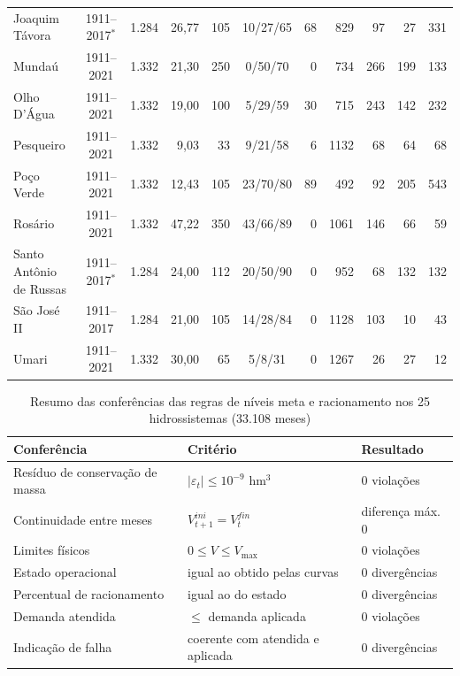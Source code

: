 \begin{table}[!htbp]
{\begin{tabular}{lcrrrcrrrrr}
        Joaquim Távora & 1911--2017$^{*}$ & 1.284 & 26,77 & 105 & 10/27/65 & 68 & 829 & 97 & 27 & 331 \\
        Mundaú & 1911--2021 & 1.332 & 21,30 & 250 & 0/50/70 & 0 & 734 & 266 & 199 & 133 \\
        Olho D'Água & 1911--2021 & 1.332 & 19,00 & 100 & 5/29/59 & 30 & 715 & 243 & 142 & 232 \\
        Pesqueiro & 1911--2021 & 1.332 & 9,03 & 33 & 9/21/58 & 6 & 1132 & 68 & 64 & 68 \\
        Poço Verde & 1911--2021 & 1.332 & 12,43 & 105 & 23/70/80 & 89 & 492 & 92 & 205 & 543 \\
        Rosário & 1911--2021 & 1.332 & 47,22 & 350 & 43/66/89 & 0 & 1061 & 146 & 66 & 59 \\
        Santo Antônio de Russas & 1911--2017$^{*}$ & 1.284 & 24,00 & 112 & 20/50/90 & 0 & 952 & 68 & 132 & 132 \\
        São José II & 1911--2017 & 1.284 & 21,00 & 105 & 14/28/84 & 0 & 1128 & 103 & 10 & 43 \\
        Umari & 1911--2021 & 1.332 & 30,00 & 65 & 5/8/31 & 0 & 1267 & 26 & 27 & 12 \\
        \bottomrule
    \end{tabular}}
\end{table}

\begin{table}[!htbp]
    \captionsetup{width=15cm}
    \caption{Resumo das conferências das regras de níveis meta e racionamento nos 25 hidrossistemas (33.108 meses)}
    \label{tab:verificacao-25-resumo}
    \centering
    \footnotesize
    \begin{tabular}{p{6.0cm}p{4.4cm}p{3.2cm}}
        \toprule
        Conferência & Critério & Resultado \\
        \midrule
        Resíduo de conservação de massa & $|\varepsilon_t|\leq10^{-9}$ hm$^3$ & 0 violações \\
        Continuidade entre meses & $V^{ini}_{t+1}=V^{fin}_{t}$ & diferença máx. 0 \\
        Limites físicos & $0\leq V\leq V_{\max}$ & 0 violações \\
        Estado operacional & igual ao obtido pelas curvas & 0 divergências \\
        Percentual de racionamento & igual ao do estado & 0 divergências \\
        Demanda atendida & $\leq$ demanda aplicada & 0 violações \\
        Indicação de falha & coerente com atendida e aplicada & 0 divergências \\
        \bottomrule
    \end{tabular}
\end{table}

